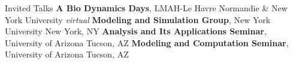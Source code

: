 \begin{rubric}{Invited Talks}
\entry*[2021.06]%
    \textbf{A Bio Dynamics Days}, LMAH-Le Havre Normandie \& New York University \hfill \textit{virtual}
\entry*[2021.04]%
    \textbf{Modeling and Simulation Group}, New York University \hfill New York, NY
\entry*[2019.03]%
    \textbf{Analysis and Its Applications Seminar}, University of Arizona \hfill Tucson, AZ
\entry*[2018.02]%
    \textbf{Modeling and Computation Seminar}, University of Arizona \hfill Tucson, AZ
\end{rubric}